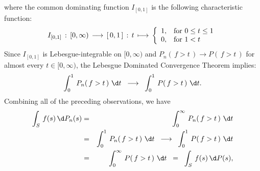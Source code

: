 where the common dominating function $I_{[0,1]}$ is the following characteristic function:
\begin{equation*}
I_{[0,1]} \,:\, [0,\infty) \,\longrightarrow\, [\,0,1\,] \,:\, t \,\longmapsto\,
\left\{\begin{array}{cl}
1, & \textnormal{for $0 \leq t \leq 1$}
\\
0, & \textnormal{for $1 < t$}
\end{array}\right.
\end{equation*}
Since $I_{[0,1]}$ is Lebesgue-integrable on $[0,\infty)$ and
$P_{n}\!\left(\,f > t\,\right) \longrightarrow P\!\left(\,f > t\,\right)$
for almost every $t \in [0,\infty)$,
the Lebesgue Dominated Convergence Theorem implies:
\begin{equation*}
\int_{0}^{1}\,P_{n}\!\left(\,f > t\,\right)\,\d t \;\;\longrightarrow\;\; \int_{0}^{1}\,P\!\left(\,f > t\,\right)\,\d t.
\end{equation*}
Combining all of the preceding observations, we have
\begin{eqnarray*}
\int_{S}\,f(s)\,\d P_{n}(s) &=& \int_{0}^{\infty}\,P_{n}\!\left(\,f > t\,\right)\,\d t
\\
&=& \int_{0}^{1}\,P_{n}\!\left(\,f > t\,\right)\,\d t \;\;\longrightarrow\;\; \int_{0}^{1}\,P\!\left(\,f > t\,\right)\,\d t
\\
&=& \int_{0}^{\infty}\,P\!\left(\,f > t\,\right)\,\d t
\;\;=\;\; \int_{S}\,f(s)\,\d P(s),
\end{eqnarray*}
